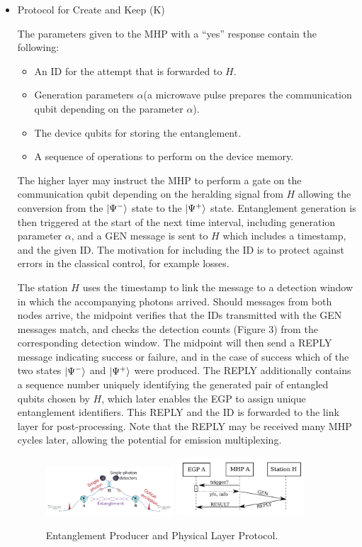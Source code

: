 \documentclass[10pt]{article}
\begin{document}
\begin{itemize}
    \item  Protocol for Create and Keep (K)
    
    The parameters given to the MHP with a ``yes'' response contain the following:
    \begin{itemize}
        \item An ID for the attempt that is forwarded to $H$.
        \item Generation parameters $\alpha$(a microwave pulse prepares the communication
        qubit depending on the parameter $\alpha$).
        \item The device qubits for storing the entanglement.
        \item A sequence of operations to perform on the device memory.
    \end{itemize}
    The higher layer may instruct the MHP to perform a gate on the communication qubit depending on the heralding signal from $H$ allowing the conversion from the $\ket{\Psi^-}$ state to the $\ket{\Psi^+}$ state. Entanglement generation is then triggered at the start of the next time interval, including generation parameter $\alpha$, and a GEN message is sent to $H$ which includes a timestamp, and the given ID. The motivation for including the ID is to protect against errors in the classical control, for
    example losses.

    The station $H$ uses the timestamp to link the message to a detection window in which the accompanying photons arrived. Should messages from both nodes arrive, the midpoint verifies that the IDs transmitted with the GEN messages match, and checks the detection counts (Figure 3) from the corresponding detection window. The midpoint will then send a REPLY message indicating success or failure, and in the case of success which of the two states $\ket{\Psi^-}$ and $\ket{\Psi^+}$ were produced. The REPLY additionally contains a sequence number uniquely identifying the generated pair of entangled qubits chosen by $H$, which later enables the EGP to assign unique entanglement identifiers. This REPLY and the ID is forwarded to the link layer for post-processing. Note that the REPLY may be received many MHP cycles later, allowing the potential for emission multiplexing.
    \begin{figure}[htbp]
        \centering
        \includegraphics[width=0.45\textwidth]{figure/trigger.jpg}
        \includegraphics[width=0.45\textwidth]{figure/physical_layer.jpg}
        \caption{Entanglement Producer and Physical Layer Protocol.}
        \label{trigger}
    \end{figure}
    

\end{itemize}
\end{document}
